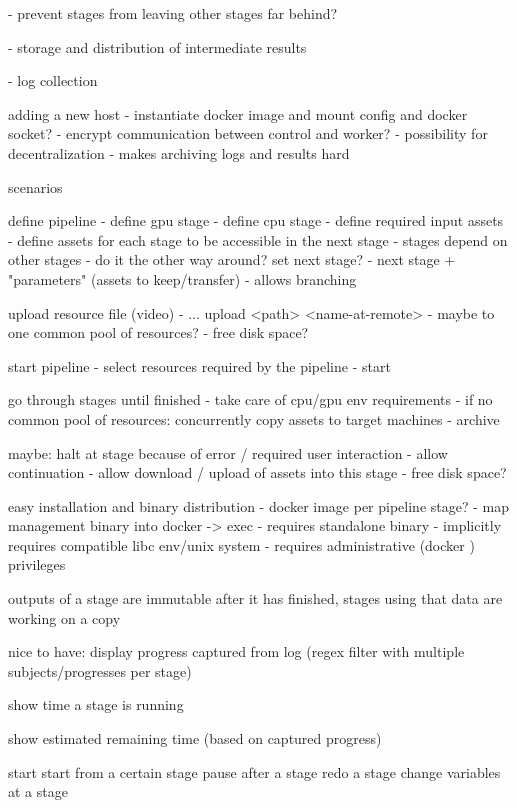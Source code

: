 - prevent stages from leaving other stages far behind?

- storage and distribution of intermediate results

- log collection




adding a new host
 - instantiate docker image and mount config and docker socket?
 - encrypt communication between control and worker?
 - possibility for decentralization
    - makes archiving logs and results hard


scenarios

define pipeline
 - define gpu stage
 - define cpu stage
 - define required input assets
 - define assets for each stage to be accessible in the next stage
 - stages depend on other stages
    - do it the other way around? set next stage?
       - next stage + "parameters" (assets to keep/transfer)
       - allows branching

upload resource file (video)
 - ... upload <path> <name-at-remote>
 - maybe to one common pool of resources?
    - free disk space?

start pipeline
 - select resources required by the pipeline
 - start
 
go through stages until finished
 - take care of cpu/gpu env requirements
 - if no common pool of resources: concurrently copy assets to target machines
 - archive 

maybe: halt at stage because of error / required user interaction
 - allow continuation
 - allow download / upload of assets into this stage
    - free disk space?
 
 
 easy installation and binary distribution
  - docker image per pipeline stage?
  - map management binary into docker -> exec
     - requires standalone binary
     - implicitly requires compatible libc env/unix system
     - requires administrative (docker ) privileges
     
 
 outputs of a stage are immutable after it has finished, stages using that data are working on a copy
 
 nice to have: display progress captured from log (regex filter with multiple subjects/progresses per stage)
 
 show time a stage is running
 
 show estimated remaining time (based on captured progress)
     
     
start
start from a certain stage
pause after a stage
redo a stage
change variables at a stage